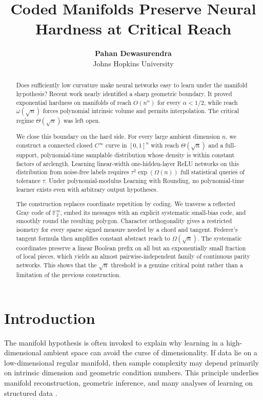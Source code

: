 \documentclass{article}
\title{Coded Manifolds Preserve Neural Hardness at Critical Reach}
\author{\textbf{Pahan Dewasurendra} \\ Johns Hopkins University}
\theoremstyle{definition}
\theoremstyle{remark}
\newcommand{\Ftwo}{\mathbb F_2}
\newcommand{\1}{\mathbf 1}
\begin{document}
\maketitle

\begin{abstract}
Does sufficiently low curvature make neural networks easy to learn under the manifold hypothesis? Recent work nearly identified a sharp geometric boundary. It proved exponential hardness on manifolds of reach $O(n^\alpha)$ for every $\alpha<1/2$, while reach $\omega(\sqrt n)$ forces polynomial intrinsic volume and permits interpolation. The critical regime $\Theta(\sqrt n)$ was left open.

We close this boundary on the hard side. For every large ambient dimension $n$, we construct a connected closed $C^\infty$ curve in $[0,1]^n$ with reach $\Theta(\sqrt n)$ and a full-support, polynomial-time samplable distribution whose density is within constant factors of arclength. Learning linear-width one-hidden-layer ReLU networks on this distribution from noise-free labels requires $\tau^2\exp(\Omega(n))$ full statistical queries of tolerance $\tau$. Under polynomial-modulus Learning with Rounding, no polynomial-time learner exists even with arbitrary output hypotheses.

The construction replaces coordinate repetition by coding. We traverse a reflected Gray code of $\Ftwo^m$, embed its messages with an explicit systematic small-bias code, and smoothly round the resulting polygon. Character orthogonality gives a restricted isometry for every sparse signed measure needed by a chord and tangent. Federer's tangent formula then amplifies constant abstract reach to $\Omega(\sqrt n)$. The systematic coordinates preserve a linear Boolean prefix on all but an exponentially small fraction of local pieces, which yields an almost pairwise-independent family of continuous parity networks. This shows that the $\sqrt n$ threshold is a genuine critical point rather than a limitation of the previous construction.
\end{abstract}

\section{Introduction}

The manifold hypothesis is often invoked to explain why learning in a high-dimensional ambient space can avoid the curse of dimensionality. If data lie on a low-dimensional regular manifold, then sample complexity may depend primarily on intrinsic dimension and geometric condition numbers. This principle underlies manifold reconstruction, geometric inference, and many analyses of learning on structured data \citep{narayanan2010sample,fefferman2016testing,niyogi2008homology}.
\end{document}
